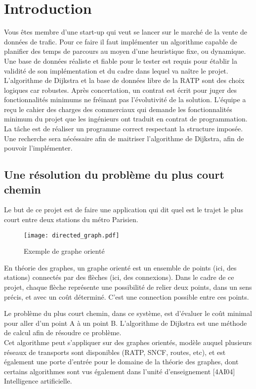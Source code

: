 \documentclass[9pts]{article}
\begin{document}
\section{Introduction}
Vous êtes membre d'une start-up qui veut se lancer sur le marché de la vente de données de trafic.
Pour ce faire il faut implémenter un algorithme capable de planifier des temps de parcours au moyen d'une heuristique fixe, ou dynamique.
Une base de données réaliste et fiable pour le tester est requis pour établir la validité de son implémentation et du cadre dans lequel va naître le projet.
L'algorithme de Dijkstra et la base de données libre de la RATP sont des choix logiques car robustes.
Après concertation, un contrat est écrit pour juger des fonctionnalités minimums ne fréinant pas l'évolutivité de la solution.
L'équipe a reçu le cahier des charges des commerciaux qui demande les fonctionnalités minimum du projet que les ingénieurs ont traduit en contrat de programmation. La tâche est de réaliser un programme correct respectant la structure imposée. Une recherche sera nécéssaire afin de maitriser l'algorithme de Dijkstra, afin de pouvoir l'implémenter.

\subsection{Une résolution du problème du plus court chemin}
Le but de ce projet est de faire une application qui dit quel est le trajet le plus court entre deux stations du métro Parisien.

\begin{figure}[h]
   \centering
   \texttt{[image: directed\_graph.pdf]}
   \caption{\label{directed_graph} Exemple de graphe orienté}
\end{figure}

En théorie des graphes, un graphe orienté est un ensemble de points (ici, des stations) connectés par des flèches (ici, des connexions). Dans le cadre de ce projet, chaque flèche représente une possibilité de relier deux points, dans un sens précis, et avec un coût déterminé. C'est une connection possible entre ces points.

Le problème du plus court chemin, dans ce système, est d'évaluer le coût minimal pour aller d'un point A à un point B. L'algorithme de Dijkstra est une méthode de calcul afin de résoudre ce problème.\\

Cet algorithme peut s'appliquer sur des graphes orientés, modèle auquel plusieurs réseaux de transports sont disponibles (RATP, SNCF, routes, etc), et est également une porte d'entrée pour le domaine de la théorie des graphes, dont certains algorithmes sont vus également dans l'unité d'enseignement [4AI04] Intelligence artificielle.\\
\end{document}
